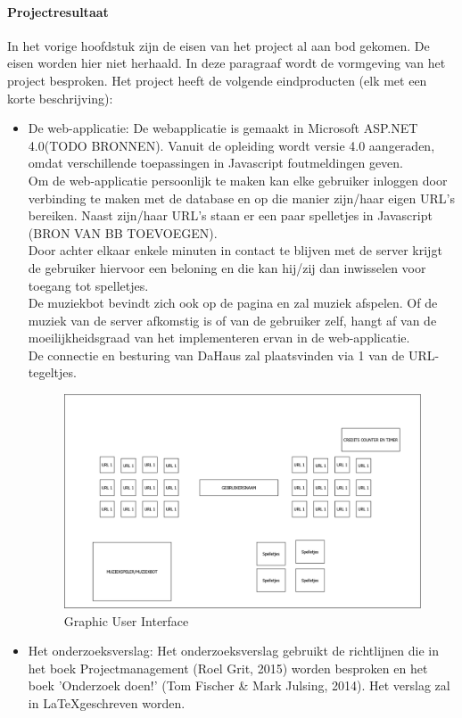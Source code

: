 \documentclass[11pt]{article}
\begin{document}
\paragraph{Projectresultaat}
\begin{flushleft}
	In het vorige hoofdstuk zijn de eisen van het project al aan bod gekomen. De eisen worden hier niet herhaald. In deze paragraaf wordt de vormgeving van het project besproken. 
	Het project heeft de volgende eindproducten (elk met een korte beschrijving):
	\begin{itemize}
		\item De web-applicatie: De webapplicatie is gemaakt in Microsoft ASP.NET 4.0(TODO BRONNEN). Vanuit de opleiding wordt versie 4.0 aangeraden, omdat verschillende toepassingen in Javascript foutmeldingen geven. \\ 
		Om de web-applicatie persoonlijk te maken kan elke gebruiker inloggen door verbinding te maken met de database en op die manier zijn/haar eigen URL's bereiken. Naast zijn/haar URL's staan er een paar spelletjes in Javascript (BRON VAN BB TOEVOEGEN).\\ Door achter elkaar enkele minuten in contact te blijven met de server krijgt de gebruiker hiervoor een beloning en die kan hij/zij dan inwisselen voor toegang tot spelletjes. \\De muziekbot bevindt zich ook op de pagina en zal muziek afspelen. Of de muziek van de server afkomstig is of van de gebruiker zelf, hangt af van de moeilijkheidsgraad van het implementeren ervan in de web-applicatie. \\
		De connectie en besturing van DaHaus zal plaatsvinden via 1 van de URL-tegeltjes. \\ \vspace{2mm}
		\begin{figure}
		\centering
		\includegraphics[width=\textwidth]{GUI} 
		\caption{Graphic User Interface}
		\end{figure}  \vspace{2mm}
		
		\item Het onderzoeksverslag: Het onderzoeksverslag gebruikt de richtlijnen die in het boek Projectmanagement (Roel Grit, 2015) worden besproken en het boek 'Onderzoek doen!' (Tom Fischer \& Mark Julsing, 2014). 
		Het verslag zal in \LaTeX geschreven worden. 
	\end{itemize}



\end{flushleft}
\newpage
\end{document}
